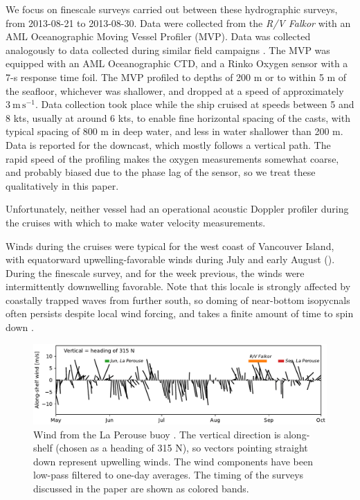 \documentclass[draft]{agujournal2019}
\begin{document}
We focus on finescale surveys carried out between these hydrographic surveys, from 2013-08-21 to 2013-08-30.  Data were collected from the \emph{R/V Falkor} with an AML Oceanographic Moving Vessel Profiler (MVP).  Data was collected analogously to data collected during similar field campaigns \cite{klymaketal15a, klymaketal16, dasaroetal18}. The MVP was equipped with an AML Oceanographic CTD, and a Rinko Oxygen sensor with a 7-s response time foil.  The MVP profiled to depths of 200 m or to within 5 m of the seafloor, whichever was shallower, and dropped at a speed of approximately $3\ \mathrm{m\,s^{-1}}$.  Data collection took place while the ship cruised at speeds between 5 and 8 kts, usually at around 6 kts, to enable fine horizontal spacing of the casts, with typical spacing  of 800 m in deep water, and less in water shallower than 200 m.  Data is reported for the downcast, which mostly follows a vertical path.  The rapid speed of the profiling makes the oxygen measurements somewhat coarse, and probably biased due to the phase lag of the sensor, so we treat these qualitatively in this paper.

Unfortunately, neither vessel had an operational acoustic Doppler profiler during the cruises with which to make water velocity measurements.

Winds during the cruises were typical for the west coast of Vancouver Island, with equatorward upwelling-favorable winds during July and early August ().  During the finescale survey, and for the week previous, the winds were intermittently downwelling favorable.  Note that this locale is strongly affected by coastally trapped waves from further south, so doming of near-bottom isopycnals often persists despite local wind forcing, and takes a finite amount of time to spin down \cite{thomsonkrassovski15, engidaetal16}.

\begin{figure}[htbp]
  \begin{center}
    \includegraphics[width=5.5in]{LaPeWind}
    \caption{
      Wind from the La Perouse buoy \cite{DFOWind2013C46206}.  The vertical direction is along-shelf (chosen as a heading of 315 N), so vectors pointing straight down represent upwelling winds.  The wind components have been low-pass filtered to one-day averages.  The timing of the surveys discussed in the paper are shown as colored bands.
      \label{fig:LaPeWind} }
  \end{center}
\end{figure}
\end{document}
